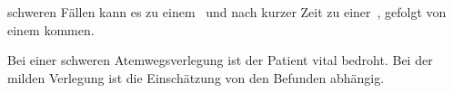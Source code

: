 \documentclass[
ngerman,
paper=a4,
asymmetric,
fontsize=10pt,
draft=false,
numbers=noenddot,
bibtotocnumbered,
footnotes=multiple,
]{scrreprt}
\newcommand{\RedFlag}{{\color{DefaultRed}\scriptsize{\VarFlag}\hspace{-0.5em}}}
\begin{document}
{\begin{ABCDEText}
\begin{itemize}
{  schweren Fällen kann es zu einem
  {\RedFlag}\, und nach kurzer Zeit zu einer
  {\RedFlag}\,, gefolgt von einem 
kommen.}
 \end{itemize}
  \item[\ABCDE{C}] 
  \item[\ABCDE{D}] 
  \item[\ABCDE{C}] 
   \item[\ABCDE{=}] Bei einer schweren Atemwegsverlegung ist
   der Patient vital bedroht. Bei der milden Verlegung ist
   die Einschätzung von den Befunden abhängig.
 \end{ABCDEText}
 }
\end{document}
